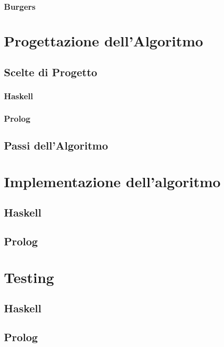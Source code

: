 \documentclass{article}
\begin{document}
    \subsubsection*{Burgers}
    

\section{Progettazione dell'Algoritmo}
\subsection{Scelte di Progetto}
    \subsubsection{Haskell}
    \subsubsection{Prolog}

\subsection{Passi dell'Algoritmo}

\section{Implementazione dell'algoritmo}

\subsection{Haskell}

\subsection{Prolog}

\section{Testing}

\subsection{Haskell}

\subsection{Prolog}
\end{document}
